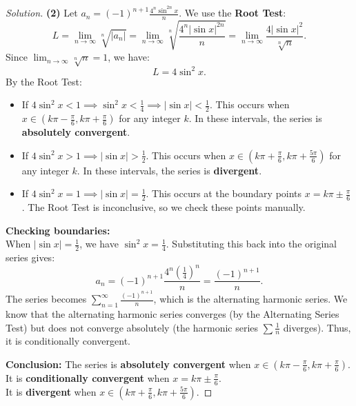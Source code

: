 \documentclass[11pt]{article}
\theoremstyle{definition}
\newenvironment{solution}{\begin{proof}[Solution]}{\end{proof}}
\begin{document}
\begin{solution}
\textbf{(2)} Let $a_n = (-1)^{n+1}\frac{4^n \sin^{2n}x}{n}$. We use the \textbf{Root Test}:
\[
L = \lim_{n \to \infty} \sqrt[n]{|a_n|} = \lim_{n \to \infty} \sqrt[n]{\frac{4^n |\sin x|^{2n}}{n}} = \lim_{n \to \infty} \frac{4 |\sin x|^2}{\sqrt[n]{n}}.
\]
Since $\lim_{n \to \infty} \sqrt[n]{n} = 1$, we have:
\[
L = 4\sin^2 x.
\]
By the Root Test:
\begin{itemize}
    \item If $4\sin^2 x < 1 \implies \sin^2 x < \frac{1}{4} \implies |\sin x| < \frac{1}{2}$.
    This occurs when $x \in \left(k\pi - \frac{\pi}{6}, k\pi + \frac{\pi}{6}\right)$ for any integer $k$. In these intervals, the series is \textbf{absolutely convergent}.
    \item If $4\sin^2 x > 1 \implies |\sin x| > \frac{1}{2}$.
    This occurs when $x \in \left(k\pi + \frac{\pi}{6}, k\pi + \frac{5\pi}{6}\right)$ for any integer $k$. In these intervals, the series is \textbf{divergent}.
    \item If $4\sin^2 x = 1 \implies |\sin x| = \frac{1}{2}$.
    This occurs at the boundary points $x = k\pi \pm \frac{\pi}{6}$. The Root Test is inconclusive, so we check these points manually.
\end{itemize}
\textbf{Checking boundaries:} \\
When $|\sin x| = \frac{1}{2}$, we have $\sin^2 x = \frac{1}{4}$. Substituting this back into the original series gives:
\[
a_n = (-1)^{n+1} \frac{4^n \left(\frac{1}{4}\right)^n}{n} = \frac{(-1)^{n+1}}{n}.
\]
The series becomes $\sum_{n=1}^{\infty} \frac{(-1)^{n+1}}{n}$, which is the alternating harmonic series.
We know that the alternating harmonic series converges (by the Alternating Series Test) but does not converge absolutely (the harmonic series $\sum \frac{1}{n}$ diverges). Thus, it is conditionally convergent.

\textbf{Conclusion:} 
The series is \textbf{absolutely convergent} when $x \in \left(k\pi - \frac{\pi}{6}, k\pi + \frac{\pi}{6}\right)$. \\
It is \textbf{conditionally convergent} when $x = k\pi \pm \frac{\pi}{6}$. \\
It is \textbf{divergent} when $x \in \left(k\pi + \frac{\pi}{6}, k\pi + \frac{5\pi}{6}\right)$.
\end{solution}
\end{document}
